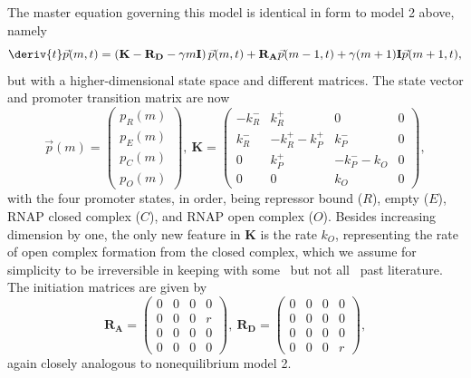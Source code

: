 The master equation governing this model is identical in form to model 2 above,
namely
\begin{equation}
\deriv{t}\vec{p}(m,t) =
\left( \mathbf{K} - \mathbf{R_D} - \gamma m \mathbf{I} \right) \vec{p}(m,t)
                + \mathbf{R_A} \vec{p}(m-1,t) +
                \gamma (m+1) \mathbf{I} \vec{p}(m+1,t),
\end{equation}
but with a higher-dimensional state space and different matrices. The
state vector and promoter transition matrix are now
\begin{equation}
\vec{p}(m) = \begin{pmatrix} p_R(m) \\ p_E(m) \\
                             p_C(m) \\ p_O(m)\end{pmatrix},\
\mathbf{K} = \begin{pmatrix} -k_R^- & k_R^+ & 0 & 0\\
                        k_R^- & -k_R^+ -k_P^+ & k_P^- & 0 \\
                        0 & k_P^+ & -k_P^- - k_O & 0 \\
                        0 & 0 & k_O & 0
                \end{pmatrix},
\end{equation}
with the four promoter states, in order, being repressor bound ($R$), empty
($E$), RNAP closed complex ($C$), and RNAP open complex ($O$). Besides
increasing dimension by one, the only new feature in $\mathbf{K}$ is the
rate $k_O$, representing the rate of open complex formation from
the closed complex, which we assume for simplicity to be irreversible
in keeping with some~\cite{Mitarai2015} but not all~\cite{DeHaseth1998}
past literature. The initiation matrices are given by
\begin{equation}
\mathbf{R_A} = \begin{pmatrix}
        0 & 0 & 0 & 0 \\ 
        0 & 0 & 0 & r \\ 
        0 & 0 & 0 & 0 \\ 
        0 & 0 & 0 & 0
                \end{pmatrix},\
\mathbf{R_D} = \begin{pmatrix}
        0 & 0 & 0 & 0 \\ 
        0 & 0 & 0 & 0 \\ 
        0 & 0 & 0 & 0 \\ 
        0 & 0 & 0 & r
                \end{pmatrix},
\end{equation}
again closely analogous to nonequilibrium model 2.

